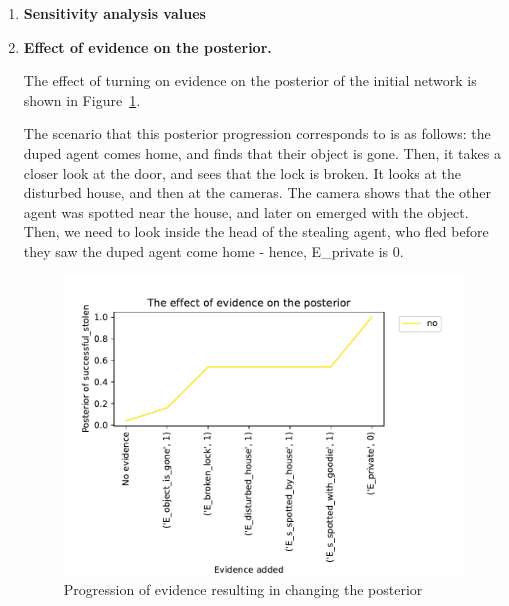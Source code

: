 \begin{enumerate}
\item \textbf{Sensitivity analysis values}

\item \textbf{Effect of evidence on the posterior.}

The effect of turning on evidence on the posterior of the initial network is shown in Figure~\ref{baseposterior}.

The scenario that this posterior progression corresponds to is as follows: the duped agent comes home, and finds that their object is gone. Then, it takes a closer look at the door, and sees that the lock is broken. It looks at the disturbed house, and then at the cameras. The camera shows that the other agent was spotted near the house, and later on emerged with the object. Then, we need to look inside the head of the stealing agent, who fled before they saw the duped agent come home - hence, E\_private is 0.

\begin{figure}[htbp]
 \centering
\includegraphics[width=0.6\linewidth]{../experiments/StolenLaptop/plots/posterior_base_networkStolenLaptop.pdf}
\caption{ Progression of evidence resulting in changing the posterior}
\label{baseposterior}
\end{figure}%


\end{enumerate}

